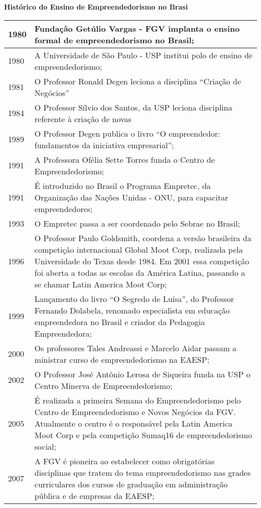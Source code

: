\begin{quadro}[htb]
\caption{\label{quadro_exemplo}\textbf{Histórico do Ensino de Empreendedorismo no Brasi}}
\begin{tabular}{p{1.5cm} p{13.0cm}}
\hline\hline
1980 & Fundação Getúlio Vargas - FGV implanta o ensino formal de empreendedorismo no Brasil;  \\\hline
1980 & A Universidade de São Paulo - USP institui polo de ensino de empreendedorismo;  \\\hline
1981 & O Professor Ronald Degen leciona a disciplina “Criação de Negócios”  \\ \hline
1984 & O Professor Sílvio dos Santos, da USP leciona disciplina referente à criação de novas \\ \hline
1989 & O Professor Degen publica o livro “O empreendedor: fundamentos da iniciativa empresarial”;  \\\hline
1991 & A Professora Ofélia Sette Torres funda o Centro de Empreendedorismo;  \\\hline
1991 & É introduzido no Brasil o Programa Empretec, da Organização das Nações Unidas - ONU, para
capacitar empreendedores;  \\\hline
1993 & O Empretec passa a ser coordenado pelo Sebrae no Brasil;  \\\hline
1996 & O Professor Paulo Goldsmith, coordena a versão brasileira da competição internacional Global Moot Corp, realizada pela Universidade do Texas desde 1984. Em 2001 essa competição foi aberta a todas as escolas da América Latina, passando a se chamar Latin America Moot Corp;\\\hline
1999 & Lançamento do livro “O Segredo de Luísa”, do Professor Fernando Dolabela, renomado
especialista em educação empreendedora no Brasil e criador da Pedagogia Empreendedora;  \\ \hline
2000 & Os professores Tales Andreassi e Marcelo Aidar passam a ministrar curso de empreendedorismo
na EAESP;  \\ \hline
 2002 & O Professor José Antônio Lerosa de Siqueira funda na USP o Centro Minerva de Empreendedorismo;  \\\hline 
   2005 & É realizada a primeira Semana do Empreendedorismo pelo Centro de Empreendedorismo e Novos Negócios da FGV. Atualmente o centro é o responsável pela Latin America Moot Corp e pela competição Sumaq16 de empreendedorismo social;  \\\hline 
   2007 & A FGV é pioneira ao estabelecer como obrigatórias disciplinas que tratem do tema empreendedorismo nas grades curriculares dos cursos de graduação em administração pública e de empresas da EAESP; \\\hline 
\end{tabular}
\end{quadro}


